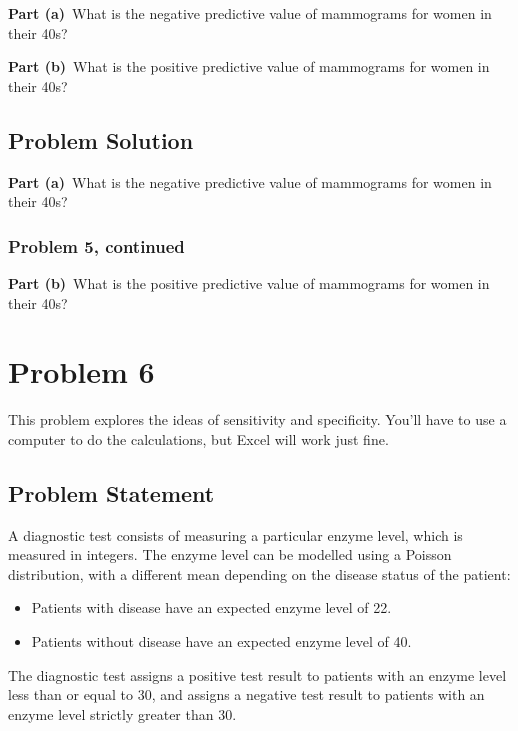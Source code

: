 \documentclass[12pt]{article}
\theoremstyle{definition}
\begin{document}
\bigskip
\noindent
{\bf Part (a)}\ What is the negative predictive value of mammograms for women in their 40s?

\bigskip
\noindent
{\bf Part (b)}\ What is the positive predictive value of mammograms for women in their 40s?


\subsection*{Problem Solution}

{\bf Part (a)}\ What is the negative predictive value of mammograms for women in their 40s?



\newpage
\subsubsection*{Problem 5, continued}


\vspace{1.5in}
\noindent
{\bf Part (b)}\ What is the positive predictive value of mammograms for women in their 40s?



\newpage
\section*{Problem 6}

This problem explores the ideas of sensitivity and specificity. You'll have to use a computer to do the calculations, but Excel will work just fine.

\subsection*{Problem Statement}

A diagnostic test consists of measuring a particular enzyme level, which is measured in integers. The enzyme level can be modelled using a Poisson distribution, with a different mean depending on the disease status of the patient:
\begin{itemize}
	\item Patients with disease have an expected enzyme level of 22.
	\item Patients without disease have an expected enzyme level of 40.
\end{itemize}
The diagnostic test assigns a positive test result to patients with an enzyme level less than or equal to 30, and assigns a negative test result to patients with an enzyme level strictly greater than 30.
\end{document}
